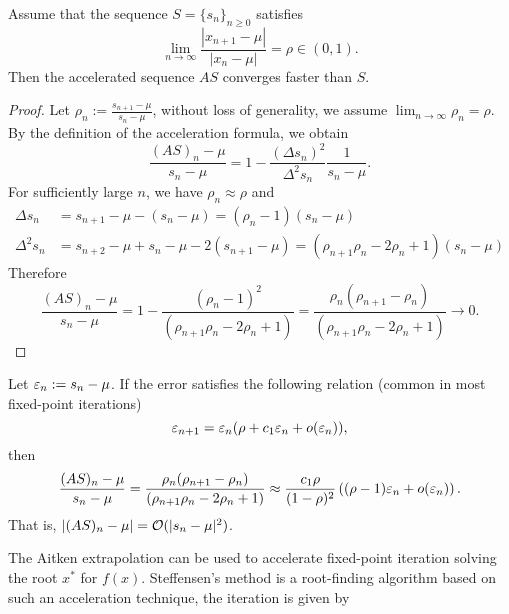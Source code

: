 \begin{theorem}
    Assume that the sequence $S = \{s_n\}_{n\ge 0}$ satisfies 
    \begin{equation}
        \lim_{n\to\infty} \frac{|x_{n+1} - \mu|}{|x_n - \mu|} = \rho \in (0, 1).
    \end{equation}
    Then the accelerated sequence $AS$ converges faster than $S$.
\end{theorem}
\begin{proof}
Let $\rho_n := \frac{s_{n+1} - \mu}{s_n - \mu}$, without loss of generality, we assume $\lim_{n\to\infty} \rho_n = \rho$.  
By the definition of the acceleration formula, we obtain 
    \begin{equation}
       \frac{ (AS)_{n} - \mu}{ s_{n} - \mu } =  1 - \frac{(\Delta s_{n})^2}{\Delta^2 s_{n}} \frac{1}{s_n -\mu}.
    \end{equation}
    For sufficiently large $n$, we have $\rho_n \approx \rho$ and 
    \begin{equation}
    \begin{aligned}
        \Delta s_n &= s_{n+1} - \mu - (s_n -\mu) = (\rho_n - 1) (s_n -\mu)    \\
        \Delta^2 s_n &= s_{n+2} - \mu + s_n -\mu - 2(s_{n+1} -\mu) = (\rho_{n+1}\rho_n-2\rho_{n}+1)(s_n -\mu)
    \end{aligned}
    \end{equation}
    Therefore
    \begin{equation}
      \frac{ (AS)_{n} - \mu}{ s_{n} - \mu } = 1 - \frac{(\rho_n-1)^2}{(\rho_{n+1}\rho_n - 2\rho_{n} + 1)}=\frac{\rho_n(\rho_{n+1} - \rho_n)}{(\rho_{n+1}\rho_n - 2\rho_{n} + 1)}  \to 0. 
    \end{equation}
\end{proof}
\begin{remark}\label{rem: 4-aitken-conv}
    Let $ \varepsilon_n := s_n - \mu$. If the error satisfies the following relation (common in most fixed-point iterations) $$\varepsilon_{n+1} = \varepsilon_n (\rho + c_1 \varepsilon_n + o(\varepsilon_n)),$$ then
    \begin{equation}
        \frac{ (AS)_{n} - \mu}{ s_{n} - \mu }  = \frac{\rho_n(\rho_{n+1} - \rho_n)}{(\rho_{n+1}\rho_n - 2\rho_{n} + 1)} \approx \frac{c_1 \rho}{(1-\rho)^2} \left((\rho - 1)\varepsilon_n + o(\varepsilon_n) \right).
    \end{equation}
    That is, $| (AS)_{n} - \mu| = \mathcal O( |s_{n} - \mu |^2 )$.
\end{remark}
The Aitken extrapolation can be used to accelerate fixed-point iteration solving the root $x^{\ast}$ for $f(x)$. Steffensen's method is a root-finding algorithm based on such an acceleration technique, the iteration is given by 
